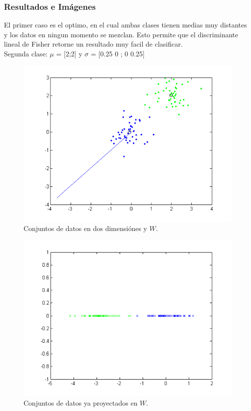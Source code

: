 \subsubsection{Resultados e Imágenes}

El primer caso es el optimo, en el cual ambas clases tienen medias muy distantes y los datos en ningun momento se mezclan. Esto permite que el discriminante lineal de Fisher retorne un resultado muy facil de clasificar.\\
Segunda clase: $\mu$ = [2;2] y $\sigma$ = [0.25 0 ; 0 0.25]

\begin{figure}[ht!]
\centering
\includegraphics[width=120mm]{img/tp4/ej4-1.png}
\caption{Conjuntos de datos en dos dimensiónes y $W$.}
\end{figure}

\begin{figure}[ht!]
\centering
\includegraphics[width=120mm]{img/tp4/ej4-2.png}
\caption{Conjuntos de datos ya proyectados en $W$.}
\end{figure}

